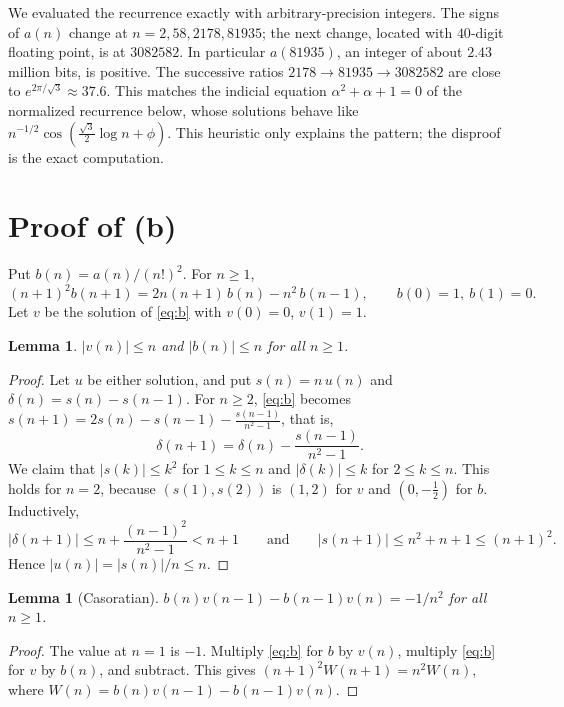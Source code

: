 \documentclass[11pt]{amsart}
\newtheorem{lemma}[theorem]{Lemma}
\theoremstyle{remark}
\begin{document}
We evaluated the recurrence exactly with arbitrary-precision integers.
The signs of $a(n)$ change at $n=2,58,2178,81935$; the next change, located with $40$-digit floating point, is at $3082582$.
In particular $a(81935)$, an integer of about $2.43$ million bits, is positive.
The successive ratios $2178\to81935\to3082582$ are close to $e^{2\pi/\sqrt3}\approx37.6$.
This matches the indicial equation $\alpha^2+\alpha+1=0$ of the normalized recurrence below, whose solutions behave like $n^{-1/2}\cos(\frac{\sqrt3}2\log n+\phi)$.
This heuristic only explains the pattern; the disproof is the exact computation.

\section{Proof of (b)}

Put $b(n)=a(n)/(n!)^2$.
For $n\ge1$,
\begin{equation}\label{eq:b}
(n+1)^2b(n+1)=2n(n+1)\,b(n)-n^2\,b(n-1),\qquad b(0)=1,\ b(1)=0 .
\end{equation}
Let $v$ be the solution of \eqref{eq:b} with $v(0)=0$, $v(1)=1$.

\begin{lemma}\label{lem:poly}
$|v(n)|\le n$ and $|b(n)|\le n$ for all $n\ge1$.
\end{lemma}

\begin{proof}
Let $u$ be either solution, and put $s(n)=n\,u(n)$ and $\delta(n)=s(n)-s(n-1)$.
For $n\ge2$, \eqref{eq:b} becomes $s(n+1)=2s(n)-s(n-1)-\frac{s(n-1)}{n^2-1}$, that is,
\[
\delta(n+1)=\delta(n)-\frac{s(n-1)}{n^2-1}.
\]
We claim that $|s(k)|\le k^2$ for $1\le k\le n$ and $|\delta(k)|\le k$ for $2\le k\le n$.
This holds for $n=2$, because $(s(1),s(2))$ is $(1,2)$ for $v$ and $(0,-\frac12)$ for $b$.
Inductively,
\[
|\delta(n+1)|\le n+\frac{(n-1)^2}{n^2-1}<n+1\qquad\text{and}\qquad|s(n+1)|\le n^2+n+1\le(n+1)^2 .
\]
Hence $|u(n)|=|s(n)|/n\le n$.
\end{proof}

\begin{lemma}[Casoratian]\label{lem:cas}
$b(n)v(n-1)-b(n-1)v(n)=-1/n^2$ for all $n\ge1$.
\end{lemma}

\begin{proof}
The value at $n=1$ is $-1$.
Multiply \eqref{eq:b} for $b$ by $v(n)$, multiply \eqref{eq:b} for $v$ by $b(n)$, and subtract.
This gives $(n+1)^2W(n+1)=n^2W(n)$, where $W(n)=b(n)v(n-1)-b(n-1)v(n)$.
\end{proof}
\end{document}
